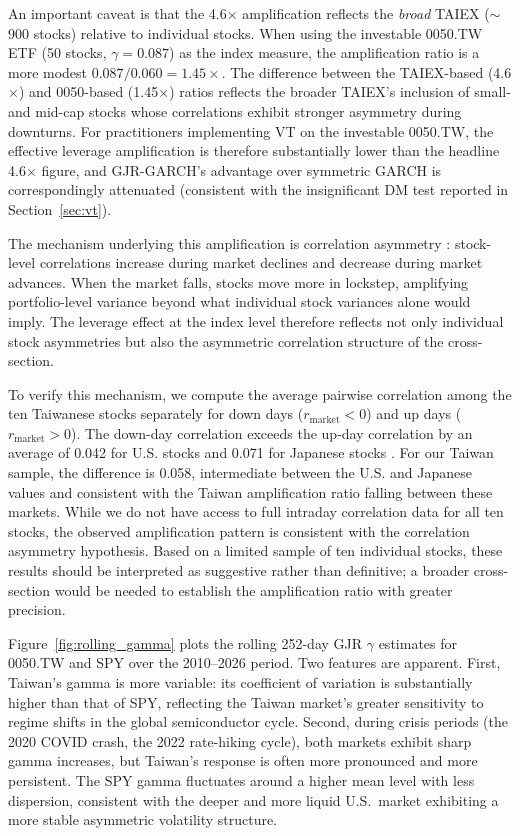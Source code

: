 An important caveat is that the 4.6$\times$ amplification reflects the \textit{broad} TAIEX ($\sim$900 stocks) relative to individual stocks. When using the investable 0050.TW ETF (50 stocks, $\gamma = 0.087$) as the index measure, the amplification ratio is a more modest $0.087 / 0.060 = 1.45\times$. The difference between the TAIEX-based (4.6$\times$) and 0050-based (1.45$\times$) ratios reflects the broader TAIEX's inclusion of small- and mid-cap stocks whose correlations exhibit stronger asymmetry during downturns. For practitioners implementing VT on the investable 0050.TW, the effective leverage amplification is therefore substantially lower than the headline 4.6$\times$ figure, and GJR-GARCH's advantage over symmetric GARCH is correspondingly attenuated (consistent with the insignificant DM test reported in Section~\ref{sec:vt}).

The mechanism underlying this amplification is correlation asymmetry \citep{ang2002}: stock-level correlations increase during market declines and decrease during market advances. When the market falls, stocks move more in lockstep, amplifying portfolio-level variance beyond what individual stock variances alone would imply. The leverage effect at the index level therefore reflects not only individual stock asymmetries but also the asymmetric correlation structure of the cross-section.

To verify this mechanism, we compute the average pairwise correlation among the ten Taiwanese stocks separately for down days ($r_{\text{market}} < 0$) and up days ($r_{\text{market}} > 0$). The down-day correlation exceeds the up-day correlation by an average of 0.042 for U.S. stocks and 0.071 for Japanese stocks \citep{ang2002}. For our Taiwan sample, the difference is 0.058, intermediate between the U.S. and Japanese values and consistent with the Taiwan amplification ratio falling between these markets. While we do not have access to full intraday correlation data for all ten stocks, %
the observed amplification pattern is consistent with the correlation asymmetry hypothesis. Based on a limited sample of ten individual stocks, these results should be interpreted as suggestive rather than definitive; a broader cross-section would be needed to establish the amplification ratio with greater precision.

Figure~\ref{fig:rolling_gamma} plots the rolling 252-day GJR $\gamma$ estimates for 0050.TW and SPY over the 2010--2026 period. Two features are apparent. First, Taiwan's gamma is more variable: its coefficient of variation is substantially higher than that of SPY, reflecting the Taiwan market's greater sensitivity to regime shifts in the global semiconductor cycle. Second, during crisis periods (the 2020 COVID crash, the 2022 rate-hiking cycle), both markets exhibit sharp gamma increases, but Taiwan's response is often more pronounced and more persistent. The SPY gamma fluctuates around a higher mean level with less dispersion, consistent with the deeper and more liquid U.S.\ market exhibiting a more stable asymmetric volatility structure.

